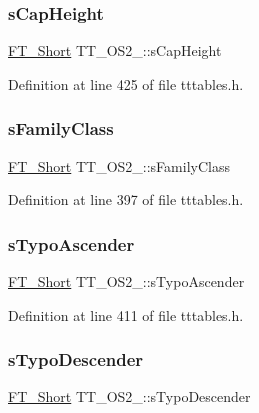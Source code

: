 \subsubsection{\texorpdfstring{sCapHeight}{sCapHeight}}
{\footnotesize\ttfamily \mbox{\hyperlink{fttypes_8h_aa7279be89046a2563cd3d4d6651fbdcf}{F\+T\+\_\+\+Short}} T\+T\+\_\+\+O\+S2\+\_\+\+::s\+Cap\+Height}



Definition at line 425 of file tttables.\+h.

\mbox{\label{struct_t_t___o_s2___a9731c34e716f9adf2d9ffa527da0153d}} 
\subsubsection{\texorpdfstring{sFamilyClass}{sFamilyClass}}
{\footnotesize\ttfamily \mbox{\hyperlink{fttypes_8h_aa7279be89046a2563cd3d4d6651fbdcf}{F\+T\+\_\+\+Short}} T\+T\+\_\+\+O\+S2\+\_\+\+::s\+Family\+Class}



Definition at line 397 of file tttables.\+h.

\mbox{\label{struct_t_t___o_s2___a81af7a8b51ee2cf89973355831d8041d}} 
\subsubsection{\texorpdfstring{sTypoAscender}{sTypoAscender}}
{\footnotesize\ttfamily \mbox{\hyperlink{fttypes_8h_aa7279be89046a2563cd3d4d6651fbdcf}{F\+T\+\_\+\+Short}} T\+T\+\_\+\+O\+S2\+\_\+\+::s\+Typo\+Ascender}



Definition at line 411 of file tttables.\+h.

\mbox{\label{struct_t_t___o_s2___a0028fad42d58d8bdfcd0d39506ade8c7}} 
\subsubsection{\texorpdfstring{sTypoDescender}{sTypoDescender}}
{\footnotesize\ttfamily \mbox{\hyperlink{fttypes_8h_aa7279be89046a2563cd3d4d6651fbdcf}{F\+T\+\_\+\+Short}} T\+T\+\_\+\+O\+S2\+\_\+\+::s\+Typo\+Descender}



